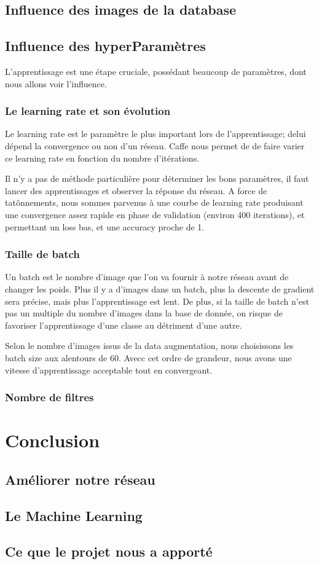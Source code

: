 \documentclass[a4paper,12pt]{article}
\begin{document}
  \subsection{Influence des images de la database}

  
  \subsection{Influence des hyperParamètres}
    L'apprentissage est une étape cruciale, possédant beaucoup de paramètres, dont nous allons voir l'influence.
    \subsubsection{Le learning rate et son évolution}
      Le learning rate est le paramètre le plus important lors de l'apprentissage; delui dépend la convergence ou non d'un réseau. Caffe nous permet de de faire varier ce learning rate en fonction du nombre d'itérations.

      Il n'y a pas de méthode particulière pour déterminer les bons paramètres, il faut lancer des apprentissages et observer la réponse du réseau. A force de tatônnements, nous sommes parvenus à une courbe de learning rate produisant une convergence assez rapide en phase de validation (environ 400 iterations), et permettant un loss bas, et une accuracy proche de 1.

    \subsubsection{Taille de batch}
      Un batch est le nombre d'image que l'on va fournir à notre réseau avant de changer les poids. Plus il y a d'images dans un batch, plus la descente de gradient sera précise, mais plus l'apprentissage est lent. De plus, si la taille de batch n'est pas un multiple du nombre d'images dans la base de donnée, on risque de favoriser l'apprentissage d'une classe au détriment d'une autre. 

      Selon le nombre d'images issus de la data augmentation, nous choisissons les batch size aux alentours de 60. Avecc cet ordre de grandeur, nous avons une vitesse d'apprentissage acceptable tout en convergeant.
    \subsubsection{Nombre de filtres}
      

\newpage
\section*{Conclusion}
  
  \subsection*{Améliorer notre réseau}
  
  \subsection*{Le Machine Learning}
  
  \subsection*{Ce que le projet nous a apporté}
\end{document}
